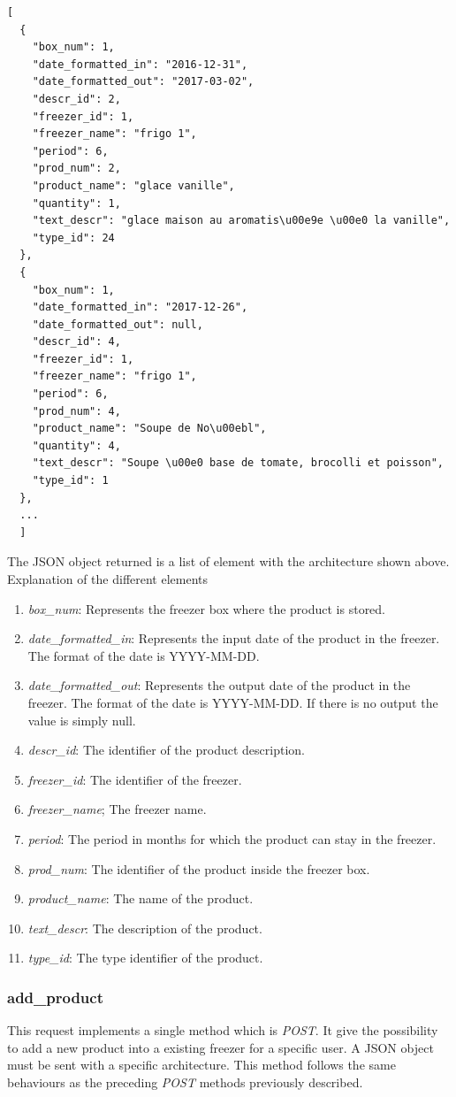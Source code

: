 \begin{lstlisting}
[
  {
    "box_num": 1, 
    "date_formatted_in": "2016-12-31", 
    "date_formatted_out": "2017-03-02", 
    "descr_id": 2, 
    "freezer_id": 1, 
    "freezer_name": "frigo 1", 
    "period": 6, 
    "prod_num": 2, 
    "product_name": "glace vanille", 
    "quantity": 1, 
    "text_descr": "glace maison au aromatis\u00e9e \u00e0 la vanille", 
    "type_id": 24
  },
  {
    "box_num": 1, 
    "date_formatted_in": "2017-12-26", 
    "date_formatted_out": null, 
    "descr_id": 4, 
    "freezer_id": 1, 
    "freezer_name": "frigo 1", 
    "period": 6, 
    "prod_num": 4, 
    "product_name": "Soupe de No\u00ebl", 
    "quantity": 4, 
    "text_descr": "Soupe \u00e0 base de tomate, brocolli et poisson", 
    "type_id": 1
  },
  ...
  ] 
\end{lstlisting}
The JSON object returned is a list of element with the architecture shown above.
Explanation of the different elements
\begin{enumerate}
\item \textit{box\_num}: Represents the freezer box where the product is stored.
\item \textit{date\_formatted\_in}: Represents the input date of the product in the freezer. The format of the date is YYYY-MM-DD.
\item \textit{date\_formatted\_out}: Represents the output date of the product in the freezer. The format of the date is YYYY-MM-DD. If there is no output the value is simply null.
\item \textit{descr\_id}: The identifier of the product description.
\item \textit{freezer\_id}: The identifier of the freezer.
\item \textit{freezer\_name}; The freezer name.
\item \textit{period}: The period in months for which the product can stay in the freezer.
\item \textit{prod\_num}: The identifier of the product inside the freezer box.
\item \textit{product\_name}: The name of the product.
\item \textit{text\_descr}: The description of the product.
\item \textit{type\_id}: The type identifier of the product.
\end{enumerate}

\subsubsection{add\_product}
This request implements a single method which is \textit{POST}. It give the possibility to add a new product into a existing freezer for a specific user. A JSON object must be sent with a specific architecture. This method follows the same behaviours as the preceding \textit{POST} methods previously described.\\

